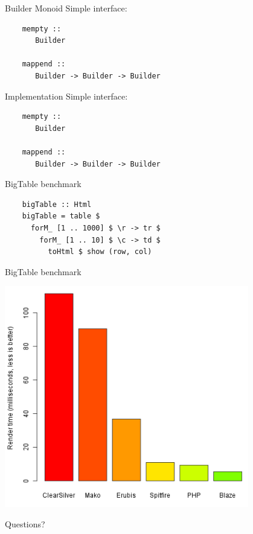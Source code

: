 \documentclass[20pt]{beamer}
\newcommand{\vspaced}{
    \vspace{5mm}
}
\begin{document}
\begin{frame}[fragile]{Builder Monoid}
    Simple interface:
    \vspaced
    \begin{lstlisting}
    mempty ::
       Builder

    mappend ::
       Builder -> Builder -> Builder
    \end{lstlisting}
\end{frame}

\begin{frame}[fragile]{Implementation}
    Simple interface:
    \vspaced
    \begin{lstlisting}
    mempty ::
       Builder

    mappend ::
       Builder -> Builder -> Builder
    \end{lstlisting}
\end{frame}

\begin{frame}[fragile, b]{BigTable benchmark}
    \begin{lstlisting}
    bigTable :: Html
    bigTable = table $
      forM_ [1 .. 1000] $ \r -> tr $
        forM_ [1 .. 10] $ \c -> td $
          toHtml $ show (row, col)
    \end{lstlisting}
    \vspaced
\end{frame}

\begin{frame}{BigTable benchmark}
    \begin{center}
    \includegraphics[width=0.8\textwidth]{images/benchmarks.png}
    \end{center}
\end{frame}

\begin{frame}{Questions?}

\end{frame}
\end{document}
